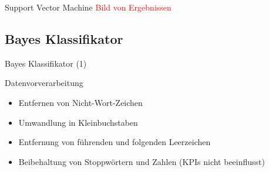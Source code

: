 \documentclass[aspectratio=169]{beamer} %
\begin{document}
\begin{frame}{Support Vector Machine}
    \textcolor{red}{Bild von Ergebnissen}
\end{frame}

\subsection{Bayes Klassifikator}

\begin{frame}{Bayes Klassifikator (1)}
    \begin{block}{Datenvorverarbeitung}
        \begin{itemize}
            \item Entfernen von Nicht-Wort-Zeichen
            \item Umwandlung in Kleinbuchstaben
            \item Entfernung von f\"uhrenden und folgenden Leerzeichen
            \item Beibehaltung von Stoppw\"ortern und Zahlen (KPIs nicht beeinflusst)
        \end{itemize}
    \end{block}
\end{frame}
\end{document}
